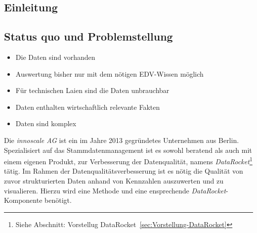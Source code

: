 \documentclass[
  language=german, %
  type=bachelor%
]{isthesis}
\begin{document}
\begin{content}



  \chapter{Einleitung}


  \section{Status quo und Problemstellung}
  \begin{itemize}
    \item Die Daten sind vorhanden
    \item Auswertung bisher nur mit dem nötigen EDV-Wissen möglich
    \item Für technischen Laien sind die Daten unbrauchbar
    \item Daten enthalten wirtschaftlich relevante Fakten
    \item Daten sind komplex
  \end{itemize}

  Die \textit{innoscale AG} ist ein im Jahre 2013 gegründetes Unternehmen aus
  Berlin.  Spezialisiert auf das Stammdatenmanagement ist es sowohl beratend
  als auch mit einem eigenen Produkt, zur Verbesserung der Datenqualität, namens
  \textit{DataRocket}\footnote{Siehe Abschnitt: Vorstellug
  DataRocket~\ref{sec:Vorstellung-DataRocket}} tätig. Im Rahmen der
  Datenqualitätsverbesserung ist es nötig die Qualität von zuvor strukturierten
  Daten anhand von Kennzahlen auszuwerten und zu visualieren. Hierzu wird eine
  Methode und eine ensprechende \textit{DataRocket}-Komponente benötigt.


\end{content}
\end{document}
